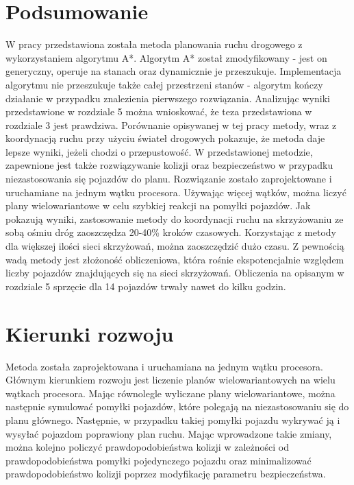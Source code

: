  \label{chap:conclusions}

\section {Podsumowanie}

W pracy przedstawiona została metoda planowania ruchu drogowego z wykorzystaniem algorytmu A*. Algorytm A* został zmodyfikowany - jest on generyczny, operuje na stanach oraz dynamicznie je przeszukuje. Implementacja algorytmu nie przeszukuje także całej przestrzeni stanów - algorytm kończy działanie w przypadku znalezienia pierwszego rozwiązania.
\newline
\indent
Analizując wyniki przedstawione w rozdziale 5 można wnioskować, że teza przedstawiona w rozdziale 3 jest prawdziwa. Porównanie opisywanej w tej pracy metody, wraz z koordynacją ruchu przy użyciu świateł drogowych pokazuje, że metoda daje lepsze wyniki, jeżeli chodzi o przepustowość. W przedstawionej metodzie, zapewnione jest także rozwiązywanie kolizji oraz bezpieczeństwo w przypadku niezastosowania się pojazdów do planu. Rozwiązanie zostało zaprojektowane i uruchamiane na jednym wątku procesora. Używając więcej wątków, można liczyć plany wielowariantowe w celu szybkiej reakcji na pomyłki pojazdów.
\newline
\indent
Jak pokazują wyniki, zastosowanie metody do koordynacji ruchu na skrzyżowaniu ze sobą ośmiu dróg zaoszczędza 20-40\% kroków czasowych. Korzystając z metody dla większej ilości sieci skrzyżowań, można zaoszczędzić dużo czasu.
\newline
\indent
Z pewnością wadą metody jest złożoność obliczeniowa, która rośnie ekspotencjalnie względem liczby pojazdów znajdujących się na sieci skrzyżowań. Obliczenia na opisanym w rozdziale 5 sprzęcie dla 14 pojazdów trwały nawet do kilku godzin.

\section{Kierunki rozwoju}

Metoda została zaprojektowana i uruchamiana na jednym wątku procesora. Głównym kierunkiem rozwoju jest liczenie planów wielowariantowych na wielu wątkach procesora. Mając równolegle wyliczane plany wielowariantowe, można następnie symulować pomyłki pojazdów, które polegają na niezastosowaniu się do planu głównego. Następnie, w przypadku takiej pomyłki pojazdu wykrywać ją i wysyłać pojazdom poprawiony plan ruchu. Mając wprowadzone takie zmiany, można kolejno policzyć prawdopodobieństwa kolizji w zależności od prawdopodobieństwa pomyłki pojedynczego pojazdu oraz minimalizować prawdopodobieństwo kolizji poprzez modyfikację parametru bezpieczeństwa.
